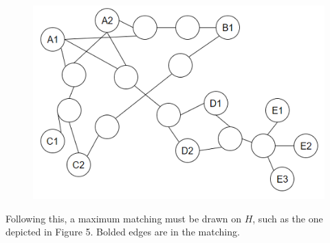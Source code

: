 \documentclass{article}
\begin{document}
	\begin{figure}[H]
		\caption{}
		\includegraphics{Figure4}
	\end{figure}

	Following this, a maximum matching must be drawn on $H$, such as the one depicted in Figure 5. Bolded edges are in the matching.
	
\end{document}
